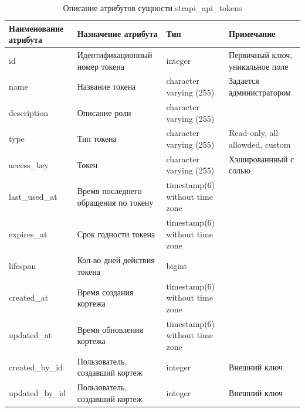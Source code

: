 \documentclass{mirea}
\begin{document}
	\begin{longtable}{ |p{}|p{}|p{}|p{}| } 
		\caption{Описание атрибутов сущности strapi\_api\_tokens}
		\endfirsthead
		\endhead
		\hline
		Наименование атрибута & Назначение атрибута & Тип & Примечание \\ \hline
		
		id & Идентификацион\-ный номер токена & integer & Первичный ключ, уникальное поле \\ \hline
		
		name & Название токена & character varying (255) & Задается администратором \\ \hline
		
		description & Описание роли  & character varying (255) & \\ \hline
		
		type & Тип токена & character varying (255) & Read-only, all-allowded, custom \\ \hline
		
		access\_key & Токен & character varying (255) & Хэширован\-нный с солью \\ \hline
		
		last\_used\_at & Время последнего обращения по токену & timestamp(6) without time zone & \\ \hline
		
		expires\_at & Срок годности токена & timestamp(6) without time zone & \\ \hline
		
		lifespan & Кол-во дней действия токена & bigint & \\ \hline 
		
		created\_at & Время создания кортежа & timestamp(6) without time zone & \\ \hline
		
		updated\_at & Время обновления кортежа & timestamp(6) without time zone & \\ \hline
		
		created\_by\_id & Пользователь, создавший кортеж & integer & Внешний ключ \\ \hline
		
		updated\_by\_id & Пользователь, создавший кортеж & integer & Внешний ключ \\ \hline
		
	\end{longtable}
\end{document}
